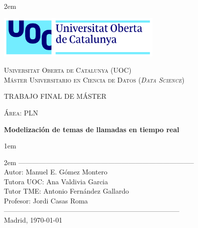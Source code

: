 \newpage
\thispagestyle{empty}

\baselineskip 2em


\centerline{\includegraphics[width=0.6\textwidth]{images/UOC-logo}}
\begin{center}
\textsc{Universitat Oberta de Catalunya (UOC) \\
 Máster Universitario en Ciencia de Datos (\textit{Data Science})\\}


\vspace*{1.5cm}

\textsc{\Large TRABAJO FINAL DE MÁSTER}

\vspace*{0.5cm}

\textsc{\large Área: PLN}



\vspace*{2.0cm}

\textbf{\Large Modelización de temas de llamadas en tiempo real}


\vspace{2.5cm}
\baselineskip 1em

\baselineskip 2em
-----------------------------------------------------------------------------\\
Autor:      Manuel E. Gómez Montero\\
Tutora UOC:      Ana Valdivia Garcia\\
Tutor TME:      Antonio Fernández Gallardo\\
Profesor:   Jordi Casas Roma\\
-----------------------------------------------------------------------------\\
\vspace*{1.5cm}
Madrid, \today

\end{center}

\newpage
\pagestyle{empty}
\hfill

